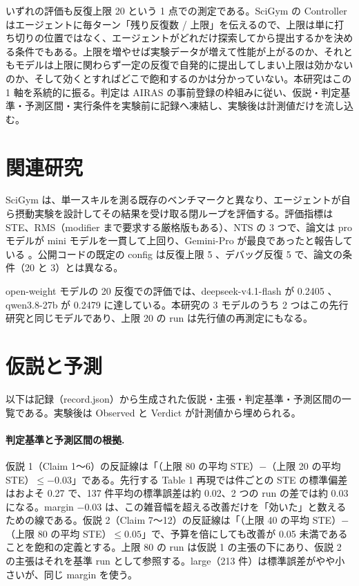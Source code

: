 \documentclass{article}
\providecommand{\unverified}[1]{#1}
\begin{document}
いずれの評価も反復上限 20 という 1 点での測定である。SciGym の Controller はエージェントに毎ターン「残り反復数 / 上限」を伝えるので、上限は単に打ち切りの位置ではなく、エージェントがどれだけ探索してから提出するかを決める条件でもある。上限を増やせば実験データが増えて性能が上がるのか、それともモデルは上限に関わらず一定の反復で自発的に提出してしまい上限は効かないのか、そして効くとすればどこで飽和するのかは分かっていない。本研究はこの 1 軸を系統的に振る。判定は AIRAS の事前登録の枠組みに従い、仮説・判定基準・予測区間・実行条件を実験前に記録へ凍結し、実験後は計測値だけを流し込む。

\section{関連研究}
\label{sec:related}
SciGym \citep{duan-2025-measuring} は、単一スキルを測る既存のベンチマークと異なり、エージェントが自ら摂動実験を設計してその結果を受け取る閉ループを評価する。評価指標は STE、RMS（modifier まで要求する厳格版もある）、NTS の 3 つで、論文は pro モデルが mini モデルを一貫して上回り、Gemini-Pro が最良であったと報告している \cite[s1.p6]{duan-2025-measuring}。公開コードの既定の config は反復上限 5 \cite[s2.p2]{h4duan-2025-scigym}、デバッグ反復 5 \cite[s2.p3]{h4duan-2025-scigym} で、論文の条件（20 と 3）とは異なる。

open-weight モデルの 20 反復での評価では、deepseek-v4.1-flash が \unverified{0.2405} \cite[s3.p2]{scigymrikyuopenmodels-2026-scigym}、qwen3.8-27b が \unverified{0.2479} \cite[s3.p3]{scigymrikyuopenmodels-2026-scigym} に達している。本研究の 3 モデルのうち 2 つはこの先行研究と同じモデルであり、上限 20 の run は先行値の再測定にもなる。

\section{仮説と予測}
\label{sec:hypothesis}
以下は記録（record.json）から生成された仮説・主張・判定基準・予測区間の一覧である。実験後は Observed と Verdict が計測値から埋められる。



\paragraph{判定基準と予測区間の根拠.}
仮説 1（Claim 1〜6）の反証線は「（上限 80 の平均 STE）$-$（上限 20 の平均 STE）$\le -0.03$」である。先行する Table 1 再現では件ごとの STE の標準偏差はおよそ 0.27 で、137 件平均の標準誤差は約 0.02、2 つの run の差では約 0.03 になる。margin $-0.03$ は、この雑音幅を超える改善だけを「効いた」と数えるための線である。仮説 2（Claim 7〜12）の反証線は「（上限 40 の平均 STE）$-$（上限 80 の平均 STE）$\le 0.05$」で、予算を倍にしても改善が 0.05 未満であることを飽和の定義とする。上限 80 の run は仮説 1 の主張の下にあり、仮説 2 の主張はそれを基準 run として参照する。large（213 件）は標準誤差がやや小さいが、同じ margin を使う。
\end{document}

